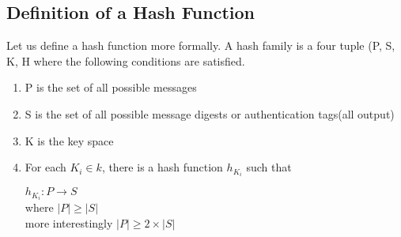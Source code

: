 \documentclass[11pt]{article}
\begin{document}
\subsection{Definition of a Hash Function}
Let us define a hash function more formally. A hash family is a four tuple (P, S, K, H where the following conditions are satisfied.
\begin{enumerate}
    \item P is the set of all possible messages
    \item S is the set of all possible message digests or authentication tags(all output)
    \item K is the key space
    \item For each $K_i \in k$, there is a hash function $h_{K_i}$ such that
    \begin{center}
        $h_{K_i} : P \rightarrow S$\\
        where $|P| \geq |S|$\\
        more interestingly $|P| \geq 2\times |S|$\\
    \end{center}
\end{enumerate}
\end{document}

